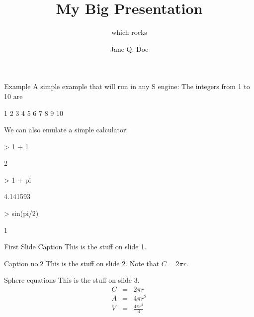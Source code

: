 \documentclass[pascal,pdf,colorBG,slideColor]{prosper}
\title{My Big Presentation}
\subtitle{which rocks}
\author{Jane Q. Doe}
\begin{document}
\maketitle


\begin{slide}{Example}
A simple example that will run in any S engine: The integers from 1 to
10 are
\begin{Schunk}
\begin{Soutput}
 [1]  1  2  3  4  5  6  7  8  9 10
\end{Soutput}
\end{Schunk}

We can also emulate a simple calculator:
\begin{Schunk}
\begin{Sinput}
> 1 + 1
\end{Sinput}
\begin{Soutput}
[1] 2
\end{Soutput}
\begin{Sinput}
> 1 + pi
\end{Sinput}
\begin{Soutput}
[1] 4.141593
\end{Soutput}
\begin{Sinput}
> sin(pi/2)
\end{Sinput}
\begin{Soutput}
[1] 1
\end{Soutput}
\end{Schunk}
\end{slide}

\begin{slide}{First Slide Caption}
	This is the stuff on slide 1.
\end{slide}


\begin{slide}{Caption no.2}
	This is the stuff on slide 2.
	Note that $C=2\pi r$.
\end{slide}


\begin{slide}{Sphere equations}
	This is the stuff on slide 3.
	\begin{eqnarray}
		C & = & 2 \pi r \\
		A & = & 4 \pi r^2 \\
		V & = & \frac{4 \pi r^3}3
	\end{eqnarray}
\end{slide}
\end{document}
